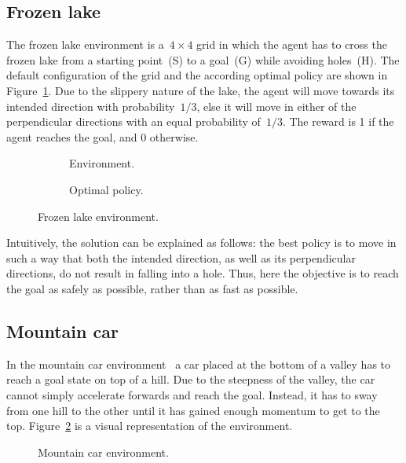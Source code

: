 \subsection{Frozen lake}
The frozen lake environment is a~${4\times4}$ grid in which the agent has to cross the frozen lake from a starting point~{(S)} to a goal~{(G)} while avoiding holes~{(H)}. The default configuration of the grid and the according optimal policy are shown in Figure~\ref{fig:frozen_lake}. Due to the slippery nature of the lake, the agent will move towards its intended direction with probability~${1/3}$, else it will move in either of the perpendicular directions with an equal probability of~${1/3}$. The reward is 1 if the agent reaches the goal, and 0 otherwise.
\begin{figure}
\centering
\begin{subfigure}{0.3\textwidth}
	\centering
	
	\caption{Environment.}
\end{subfigure}
\begin{subfigure}{0.3\textwidth}
	\centering
	
	\caption{Optimal policy.}
\end{subfigure}
\caption{Frozen lake environment.}
\label{fig:frozen_lake}
\end{figure}

Intuitively, the solution can be explained as follows: the best policy is to move in such a way that both the intended direction, as well as its perpendicular directions, do not result in falling into a hole. Thus, here the objective is to reach the goal as safely as possible, rather than as fast as possible.

\subsection{Mountain car}
In the mountain car environment~\cite{moore1990control} a car placed at the bottom of a valley has to reach a goal state on top of a hill. Due to the steepness of the valley, the car cannot simply accelerate forwards and reach the goal. Instead, it has to sway from one hill to the other until it has gained enough momentum to get to the top. Figure~\ref{fig:mountain_car} is a visual representation of the environment.
\begin{figure}
\centering

\caption{Mountain car environment.}
\label{fig:mountain_car}
\end{figure}

